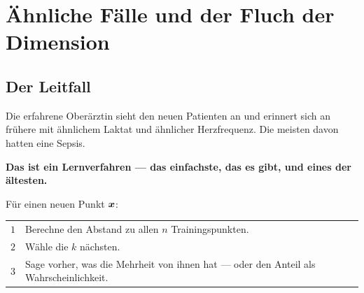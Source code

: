 \chapter{Ähnliche Fälle und der Fluch der Dimension}

\section{Der Leitfall}

\begin{merksatz}
Die erfahrene Oberärztin sieht den neuen Patienten an und erinnert sich an frühere mit ähnlichem Laktat und ähnlicher Herzfrequenz. Die meisten davon hatten eine Sepsis.

\begin{center}
\begin{minipage}{0.9\textwidth}
\textbf{Das ist ein Lernverfahren --- das einfachste, das es gibt, und eines der ältesten.}
\end{minipage}
\end{center}

\begin{center}
\begin{minipage}{0.88\textwidth}
\end{minipage}
\end{center}
\end{merksatz}

\begin{definition}
Für einen neuen Punkt $\boldsymbol{x}$:
\begin{center}
{\small
\renewcommand{\arraystretch}{1.5}
\begin{tabular}{@{}P{1.0cm}P{7.4cm}@{}}
\toprule
$1$ & Berechne den Abstand zu allen $n$ Trainingspunkten.\\
$2$ & Wähle die $k$ nächsten.\\
$3$ & Sage vorher, was die Mehrheit von ihnen hat --- oder den Anteil als Wahrscheinlichkeit.\\
\bottomrule
\end{tabular}}
\end{center}
\end{definition}

